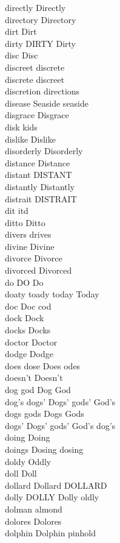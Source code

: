 directly Directly\\
directory Directory\\
dirt Dirt\\
dirty DIRTY Dirty\\
disc Disc\\
discreet discrete\\
discrete discreet\\
discretion directions\\
disease Seaside seaside\\
disgrace Disgrace\\
disk kids\\
dislike Dislike\\
disorderly Disorderly\\
distance Distance\\
distant DISTANT\\
distantly Distantly\\
distrait DISTRAIT\\
dit itd\\
ditto Ditto\\
divers drives\\
divine Divine\\
divorce Divorce\\
divorced Divorced\\
do DO Do\\
doaty toady today Today\\
doc Doc cod\\
dock Dock\\
docks Docks\\
doctor Doctor\\
dodge Dodge\\
does dose Does odes\\
doesn't Doesn't\\
dog god Dog God\\
dog's dogs' Dogs' gods' God's\\
dogs gods Dogs Gods\\
dogs' Dogs' gods' God's dog's\\
doing Doing\\
doings Dosing dosing\\
doldy Oddly\\
doll Doll\\
dollard Dollard DOLLARD\\
dolly DOLLY Dolly oldly\\
dolman almond\\
dolores Dolores\\
dolphin Dolphin pinhold\\

